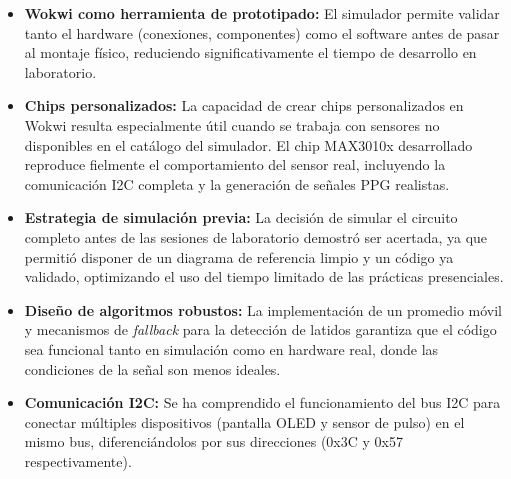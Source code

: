 \documentclass[11pt,a4paper]{article}
\begin{document}
\begin{itemize}
    \item \textbf{Wokwi como herramienta de prototipado:} El simulador permite validar tanto el hardware (conexiones, componentes) como el software antes de pasar al montaje físico, reduciendo significativamente el tiempo de desarrollo en laboratorio.
    
    \item \textbf{Chips personalizados:} La capacidad de crear chips personalizados en Wokwi resulta especialmente útil cuando se trabaja con sensores no disponibles en el catálogo del simulador. El chip MAX3010x desarrollado reproduce fielmente el comportamiento del sensor real, incluyendo la comunicación I2C completa y la generación de señales PPG realistas.
    
    \item \textbf{Estrategia de simulación previa:} La decisión de simular el circuito completo antes de las sesiones de laboratorio demostró ser acertada, ya que permitió disponer de un diagrama de referencia limpio y un código ya validado, optimizando el uso del tiempo limitado de las prácticas presenciales.
    
    \item \textbf{Diseño de algoritmos robustos:} La implementación de un promedio móvil y mecanismos de \textit{fallback} para la detección de latidos garantiza que el código sea funcional tanto en simulación como en hardware real, donde las condiciones de la señal son menos ideales.
    
    \item \textbf{Comunicación I2C:} Se ha comprendido el funcionamiento del bus I2C para conectar múltiples dispositivos (pantalla OLED y sensor de pulso) en el mismo bus, diferenciándolos por sus direcciones (0x3C y 0x57 respectivamente).
\end{itemize}
\end{document}

